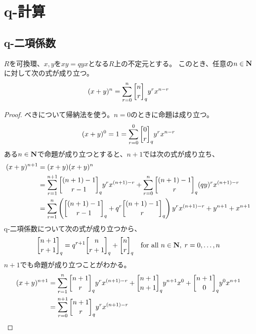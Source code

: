 {\setlength\arraycolsep{2pt}
%
\section{q-計算}\label{s1:q-計算} %
\subsection{q-二項係数}\label{s2:q-二項係数} %
	\begin{proposition}[Schutzenbergerの公式]
	\label{prop:Schutzenbergerの公式} %
		$R$を可換環、$x,y$を$xy=qyx$となる$R$上の不定元とする。
		このとき、任意の$n\in\mathbf{N}$に対して次の式が成り立つ。
		\begin{equation*}\begin{split}
			(x + y)^n = \sum_{r=0}^n\qbinom{n}{r}_q y^rx^{n-r}
		\end{split}\end{equation*}
	\end{proposition} %
	\begin{proof} %
		べきについて帰納法を使う。$n=0$のときに命題は成り立つ。
		\begin{equation*}\begin{split}
			(x+y)^0 = 1 = \sum_{r=0}^0\qbinom{0}{r}_q y^rx^{n-r}
		\end{split}\end{equation*}
		ある$n\in\mathbf{N}$で命題が成り立つとすると、$n+1$では次の式が成り立ち、
		\begin{equation*}\begin{split}
			(x+y)^{n+1} &= (x+y)(x+y)^n \\
			&= \sum_{r=1}^{n+1} \qbinom{(n+1) - 1}{r - 1}_q y^rx^{(n+1) - r}
				+ \sum_{r=0}^{n} \qbinom{(n+1) - 1}{r}_q (qy)^rx^{(n+1) - r} \\
			&= \sum_{r=1}^n \plr{
				\qbinom{(n+1) - 1}{r - 1}_q + q^r\qbinom{(n+1) - 1}{r}_q} 
				y^rx^{(n+1) - r} + y^{n+1} + x^{n+1} \\
		\end{split}\end{equation*}
		q-二項係数について次の式が成り立つから、
		\begin{equation*}\begin{split}
			\qbinom{n+1}{r+1}_q = q^{r+1}\qbinom{n}{r+1}_q + \qbinom{n}{r}_q
			\quad\text{for all } n\in\sizen,\; r=0,\dots,n
		\end{split}\end{equation*}
		$n+1$でも命題が成り立つことがわかる。
		\begin{equation*}\begin{split}
			(x+y)^{n+1} &= \sum_{r=1}^n \qbinom{n+1}{r}_q y^rx^{(n+1)-r}
			+ \qbinom{n+1}{n+1}_q y^{n+1}x^0 + \qbinom{n+1}{0}_q y^0x^{n+1} \\
			&= \sum_{r=0}^{n+1} \qbinom{n+1}{r}_q y^rx^{(n+1)-r}
		\end{split}\end{equation*}
	\end{proof} %

}
